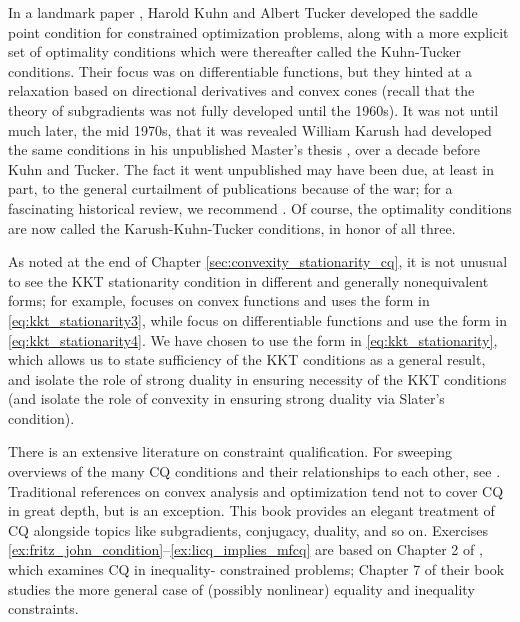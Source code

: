 In a landmark paper \cite{kuhn1951nonlinear}, Harold Kuhn and Albert Tucker
developed the saddle point condition for constrained optimization problems,
along with a more explicit set of optimality conditions which were thereafter
called the Kuhn-Tucker conditions. Their focus was on differentiable functions,
but they hinted at a relaxation based on directional derivatives and
convex cones (recall that the theory of subgradients was not fully developed
until the 1960s). It was not until much later, the mid 1970s, that it was
revealed  William Karush had developed the same conditions in his unpublished
Master's thesis \cite{karush1939minima}, over a decade before Kuhn and 
Tucker. The fact it went unpublished may have been due, at least in part, to the  
general curtailment of publications because of the war; for a fascinating
historical review, we  recommend \cite{kuhn1976nonlinear,
  kjeldsen2000contextualized, cottle2012william}. Of course, the optimality
conditions are now called the Karush-Kuhn-Tucker conditions, in honor of all
three.     

As noted at the end of Chapter \ref{sec:convexity_stationarity_cq}, it is not
unusual to see the KKT stationarity condition in different and generally
nonequivalent forms; for example, \cite{rockafellar1970convex} focuses on convex
functions and uses the form in \eqref{eq:kkt_stationarity3}, while
\cite{boyd2004convex} focus on differentiable functions and use the form in 
\eqref{eq:kkt_stationarity4}. We have chosen to use the form 
in \eqref{eq:kkt_stationarity}, which allows us to state sufficiency of the KKT 
conditions as a general result, and isolate the role of strong duality in 
ensuring necessity of the KKT conditions (and isolate the role of convexity in
ensuring strong duality via Slater's condition). 

There is an extensive literature on constraint qualification. For sweeping
overviews of the many CQ conditions and their relationships to each other, 
see \cite{peterson1973review, giorgi2018guided}. Traditional references on
convex analysis and optimization tend not to cover CQ in great depth, but   
\cite{borwein2006convex} is an exception. This book provides an elegant
treatment of CQ alongside topics like subgradients, conjugacy, duality, and so
on. Exercises \ref{ex:fritz_john_condition}--\ref{ex:licq_implies_mfcq} are
based on Chapter 2 of \cite{borwein2006convex}, which examines CQ in inequality-
constrained problems; Chapter 7 of their book studies the more general case of
(possibly nonlinear) equality and inequality constraints. 

